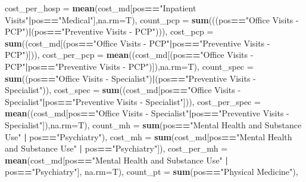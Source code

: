 \documentclass[]{article}
\newenvironment{Shaded}{\begin{snugshade}}{\end{snugshade}}
\newcommand{\KeywordTok}[1]{\textcolor[rgb]{0.13,0.29,0.53}{\textbf{#1}}}
\newcommand{\DataTypeTok}[1]{\textcolor[rgb]{0.13,0.29,0.53}{#1}}
\newcommand{\StringTok}[1]{\textcolor[rgb]{0.31,0.60,0.02}{#1}}
\newcommand{\OperatorTok}[1]{\textcolor[rgb]{0.81,0.36,0.00}{\textbf{#1}}}
\newcommand{\NormalTok}[1]{#1}
\begin{document}
\begin{Shaded}
\begin{Highlighting}[]
{{{{{{            \DataTypeTok{cost_per_hosp =} \KeywordTok{mean}\NormalTok{(cost_md[pos}\OperatorTok{==}\StringTok{"Inpatient Visits"}\OperatorTok{|}\NormalTok{pos}\OperatorTok{==}\StringTok{"Medical"}\NormalTok{],}\DataTypeTok{na.rm=}\NormalTok{T),}
            \DataTypeTok{count_pcp =} \KeywordTok{sum}\NormalTok{(((pos}\OperatorTok{==}\StringTok{"Office Visits - PCP"}\NormalTok{)}\OperatorTok{|}\NormalTok{(pos}\OperatorTok{==}\StringTok{"Preventive Visits - PCP"}\NormalTok{))),}
            \DataTypeTok{cost_pcp =} \KeywordTok{sum}\NormalTok{((cost_md[(pos}\OperatorTok{==}\StringTok{"Office Visits - PCP"}\OperatorTok{|}\NormalTok{pos}\OperatorTok{==}\StringTok{"Preventive Visits - PCP"}\NormalTok{)])),}
            \DataTypeTok{cost_per_pcp =} \KeywordTok{mean}\NormalTok{((cost_md[(pos}\OperatorTok{==}\StringTok{"Office Visits - PCP"}\OperatorTok{|}\NormalTok{pos}\OperatorTok{==}\StringTok{"Preventive Visits - PCP"}\NormalTok{)]),}\DataTypeTok{na.rm=}\NormalTok{T),}
            \DataTypeTok{count_spec =} \KeywordTok{sum}\NormalTok{((pos}\OperatorTok{==}\StringTok{"Office Visits - Specialist"}\NormalTok{)}\OperatorTok{|}\NormalTok{(pos}\OperatorTok{==}\StringTok{"Preventive Visits - Specialist"}\NormalTok{)),}
            \DataTypeTok{cost_spec =} \KeywordTok{sum}\NormalTok{((cost_md[pos}\OperatorTok{==}\StringTok{"Office Visits - Specialist"}\OperatorTok{|}\NormalTok{pos}\OperatorTok{==}\StringTok{"Preventive Visits - Specialist"}\NormalTok{])),}
            \DataTypeTok{cost_per_spec =} \KeywordTok{mean}\NormalTok{((cost_md[pos}\OperatorTok{==}\StringTok{"Office Visits - Specialist"}\OperatorTok{|}\NormalTok{pos}\OperatorTok{==}\StringTok{"Preventive Visits - Specialist"}\NormalTok{]),}\DataTypeTok{na.rm=}\NormalTok{T),}
            \DataTypeTok{count_mh =} \KeywordTok{sum}\NormalTok{(pos}\OperatorTok{==}\StringTok{"Mental Health and Substance Use"} \OperatorTok{|}\StringTok{ }\NormalTok{pos}\OperatorTok{==}\StringTok{"Psychiatry"}\NormalTok{),}
            \DataTypeTok{cost_mh =} \KeywordTok{sum}\NormalTok{(cost_md[pos}\OperatorTok{==}\StringTok{"Mental Health and Substance Use"} \OperatorTok{|}\StringTok{ }\NormalTok{pos}\OperatorTok{==}\StringTok{"Psychiatry"}\NormalTok{]),}
            \DataTypeTok{cost_per_mh =} \KeywordTok{mean}\NormalTok{(cost_md[pos}\OperatorTok{==}\StringTok{"Mental Health and Substance Use"} \OperatorTok{|}\StringTok{ }\NormalTok{pos}\OperatorTok{==}\StringTok{"Psychiatry"}\NormalTok{], }\DataTypeTok{na.rm=}\NormalTok{T),}
            \DataTypeTok{count_pt =} \KeywordTok{sum}\NormalTok{(pos}\OperatorTok{==}\StringTok{"Physical Medicine"}\NormalTok{),}
}}}}}}
\end{Highlighting}
\end{Shaded}
\end{document}
